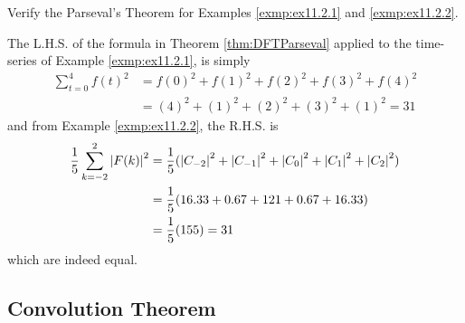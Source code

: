 \begin{exmp}
Verify the Parseval's Theorem for Examples \ref{exmp:ex11.2.1} and \ref{exmp:ex11.2.2}.
\end{exmp}
\begin{solution}
The L.H.S. of the formula in Theorem \ref{thm:DFTParseval} applied to the time-series of Example \ref{exmp:ex11.2.1}, is simply
\begin{align*}
\sum_{t=0}^{4} f(t)^2 &= f(0)^2 + f(1)^2 + f(2)^2 + f(3)^2 + f(4)^2 \\
&= (4)^2 + (1)^2 + (2)^2 + (3)^2 + (1)^2 = 31    
\end{align*}
and from Example \ref{exmp:ex11.2.2}, the R.H.S. is
\begin{align*}
\frac{1}{5}\sum_{k=-2}^{2} \abs{F(k)}^2 &= \frac{1}{5}(\abs{C_{-2}}^2 + \abs{C_{-1}}^2 + \abs{C_{0}}^2 + \abs{C_{1}}^2 + \abs{C_{2}}^2) \\
&= \frac{1}{5}(16.33 + 0.67 + 121 + 0.67 + 16.33) \\
&= \frac{1}{5} (155) = 31
\end{align*}
which are indeed equal.
\end{solution}

\subsection{Convolution Theorem}

